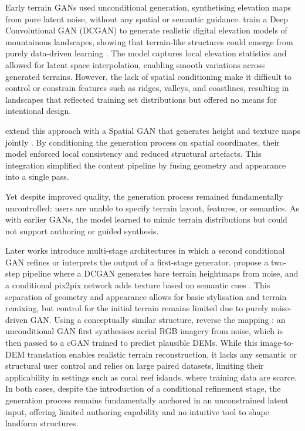 Early terrain GANs used unconditional generation, synthetising elevation maps from pure latent noise, without any spatial or semantic guidance.  train a Deep Convolutional GAN (DCGAN) to generate realistic digital elevation models of mountainous landscapes, showing that terrain-like structures could emerge from purely data-driven learning \cite{WulffJensen2018}. The model captures local elevation statistics and allowed for latent space interpolation, enabling smooth variations across generated terrains. However, the lack of spatial conditioning make it difficult to control or constrain features such as ridges, valleys, and coastlines, resulting in landscapes that reflected training set distributions but offered no means for intentional design.

 extend this approach with a Spatial GAN that generates height and texture maps jointly \cite{Spick2019}. By conditioning the generation process on spatial coordinates, their model enforced local consistency and reduced structural artefacts. This integration simplified the content pipeline by fusing geometry and appearance into a single pass. 

Yet despite improved quality, the generation process remained fundamentally uncontrolled: users are unable to specify terrain layout, features, or semantics. As with earlier GANs, the model learned to mimic terrain distributions but could not support authoring or guided synthesis.

Later works introduce multi-stage architectures in which a second conditional GAN refines or interprets the output of a first-stage generator.  propose a two-step pipeline where a DCGAN generates bare terrain heightmaps from noise, and a conditional pix2pix network adds texture based on semantic cues \cite{Beckham2017}. This separation of geometry and appearance allows for basic stylisation and terrain remixing, but control for the initial terrain remains limited due to purely noise-driven GAN. Using a conceptually similar structure,  reverse the mapping \cite{Panagiotou2020}: an unconditional GAN first synthesises aerial RGB imagery from noise, which is then passed to a cGAN trained to predict plausible DEMs. While this image-to-DEM translation enables realistic terrain reconstruction, it lacks any semantic or structural user control and relies on large paired datasets, limiting their applicability in settings such as coral reef islands, where training data are scarce. In both cases, despite the introduction of a conditional refinement stage, the generation process remains fundamentally anchored in an unconstrained latent input, offering limited authoring capability and no intuitive tool to shape landform structures.

